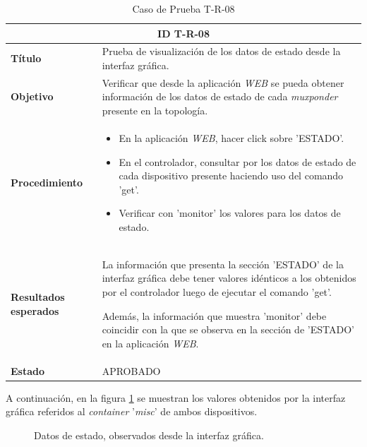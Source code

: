   
  \begin{table}[H]
    \centering
    \begin{tabular}{ |m{2.5cm}|m{11cm}|  }
    \hline
    \multicolumn{2}{|c|}{ \textbf{ID T-R-08} } \\
    \hline
    \centering
    \textbf{Título} & Prueba de visualización de los datos de estado desde la interfaz gráfica.  \\
    \hline
    \centering
    \textbf{Objetivo} & Verificar que desde la aplicación \textit{WEB} se pueda obtener información de los datos de estado de cada \textit{muxponder} presente en la topología.   \\
    \hline
    \centering
    \textbf{Procedimiento} & \begin{itemize}
      \item En la aplicación \textit{WEB}, hacer click sobre 'ESTADO'.
      \item En el controlador, consultar por los datos de estado de cada dispositivo presente haciendo uso del comando 'get'. 
      \item Verificar con 'monitor' los valores para los datos de estado.
    \end{itemize}     \\
    \hline
    \centering
    \textbf{Resultados esperados} & 
    La información que presenta la sección 'ESTADO' de la interfaz gráfica debe tener valores idénticos a los obtenidos por el controlador luego de ejecutar el comando 'get'.

Además, la información que muestra 'monitor' debe coincidir con la que se observa en la sección de 'ESTADO' en la aplicación \textit{WEB}.
      \\
    
      \hline
    \centering
      \textbf{Estado}    & APROBADO  \\
    \hline
    \end{tabular}
    
    \caption{Caso de Prueba T-R-08}
    \label{tab:TR08}
    \end{table}

    A continuación, en la figura \ref{fig:test8_1} se muestran los valores obtenidos por la interfaz gráfica referidos al \textit{container} '\textit{misc}' de ambos dispositivos. 

    \begin{figure}[H]
        \centering
        \caption{Datos de estado, observados desde la interfaz gráfica.}
        \label{fig:test8_1}
      \end{figure}

